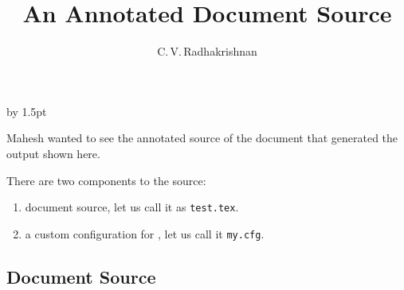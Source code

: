\documentclass[doc,sspro]{stm}
\begin{document}
\title{An Annotated Document Source}

\author{C.\,V.\,Radhakrishnan}



\maketitle

\advance\baselineskip by 1.5pt

\noindent
Mahesh wanted to see the annotated source of the \tex document that
generated the output
{shown here}. 

There are two components to the source:
\begin{enumerate}
\item document source, let us call it as \verb'test.tex'.
\item a custom configuration for \texht, let us call it \verb'my.cfg'.

\end{enumerate}

\subsection*{Document Source}
\end{document}
